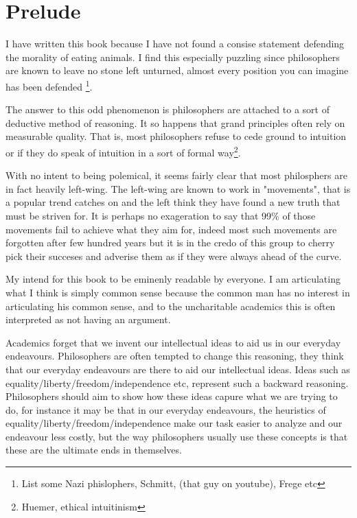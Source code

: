 \documentclass[12pt]{report}
\numberwithin{equation}{section}
\begin{document}
\tableofcontents 

\newpage

\chapter{Prelude}
I have written this book because I have not found a consise statement defending the morality of eating animals. I find this especially puzzling since philosophers are known to leave no stone left unturned, almost every position you can imagine has been defended \footnote{List some Nazi phislophers, Schmitt, (that guy on youtube), Frege etc}. 

The answer to this odd phenomenon is philosophers are attached to a sort of deductive method of reasoning. It so happens that grand principles often rely on measurable quality. That is, most philosophers refuse to cede ground to intuition or if they do speak of intuition in a sort of formal way\footnote{Huemer, ethical intuitinism}. 

With no intent to being polemical, it seems fairly clear that most philosphers are in fact heavily left-wing. The left-wing are known to work in "movements", that is a popular trend catches on and the left think they have found a new truth that must be striven for. It is perhaps no exageration to say that 99\% of those movements fail to achieve what they aim for, indeed most such movements are forgotten after few hundred years but it is in the credo of this group to cherry pick their succeses and adverise them as if they were always ahead of the curve. 

My intend for this book to be eminenly readable by everyone. I am articulating what I think is simply common sense because the common man has no interest in articulating his common sense, and to the uncharitable academics this is often interpreted as not having an argument. 

Academics forget that we invent our intellectual ideas to aid us in our everyday endeavours. Philosophers are often tempted to change this reasoning, they think that our everyday endeavours are there to aid our intellectual ideas. Ideas such as equality/liberty/freedom/independence etc, represent such a backward reasoning. Philosophers should aim to show how these ideas capure what we are trying to do, for instance it may be that in our everyday endeavours, the heuristics of equality/liberty/freedom/independence make our task easier to analyze and our endeavour less costly, but the way philosophers usually use these concepts is that these are the ultimate ends in themselves. 
\end{document}
